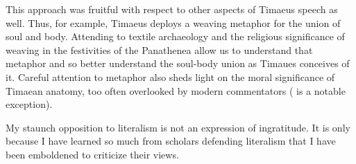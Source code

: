 This approach was fruitful with respect to other aspects of Timaeus speech as well. Thus, for example, Timaeus deploys a weaving metaphor for the union of soul and body. Attending to textile archaeology and the religious significance of weaving in the festivities of the Panathenea allow us to understand that metaphor and so better understand the soul-body union as Timaues conceives of it. Careful attention to metaphor also sheds light on the moral significance of Timaean anatomy, too often overlooked by modern commentators (\citealt{Steel:2001ay} is a notable exception).

My staunch opposition to literalism is not an expression of ingratitude. It is only because I have learned so much from scholars defending literalism that I have been emboldened to criticize their views.



